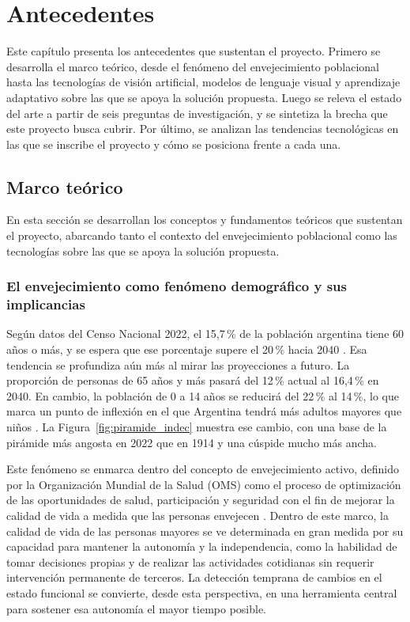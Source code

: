 \chapter{Antecedentes}\label{chapter02}

Este capítulo presenta los antecedentes que sustentan el proyecto.
Primero se desarrolla el marco teórico, desde el fenómeno del envejecimiento poblacional hasta las tecnologías de visión artificial, modelos de lenguaje visual y aprendizaje adaptativo sobre las que se apoya la solución propuesta.
Luego se releva el estado del arte a partir de seis preguntas de investigación, y se sintetiza la brecha que este proyecto busca cubrir.
Por último, se analizan las tendencias tecnológicas en las que se inscribe el proyecto y cómo se posiciona frente a cada una.

\section{Marco teórico}

En esta sección se desarrollan los conceptos y fundamentos teóricos que sustentan el proyecto, abarcando tanto el contexto del envejecimiento poblacional como las tecnologías sobre las que se apoya la solución propuesta.

\subsection{El envejecimiento como fenómeno demográfico y sus implicancias}

Según datos del Censo Nacional 2022, el 15,7\,\% de la población argentina tiene 60 años o más, y se espera que ese porcentaje supere el 20\,\% hacia 2040 \parencite{INDEC2024}.
Esa tendencia se profundiza aún más al mirar las proyecciones a futuro.
La proporción de personas de 65 años y más pasará del 12\,\% actual al 16,4\,\% en 2040.
En cambio, la población de 0 a 14 años se reducirá del 22\,\% al 14\,\%, lo que marca un punto de inflexión en el que Argentina tendrá más adultos mayores que niños \parencite{INDEC2024}.
La Figura~\ref{fig:piramide_indec} muestra ese cambio, con una base de la pirámide más angosta en 2022 que en 1914 y una cúspide mucho más ancha.

Este fenómeno se enmarca dentro del concepto de envejecimiento activo, definido por la Organización Mundial de la Salud (OMS) como el proceso de optimización de las oportunidades de salud, participación y seguridad con el fin de mejorar la calidad de vida a medida que las personas envejecen \parencite{OMS2002}.
Dentro de este marco, la calidad de vida de las personas mayores se ve determinada en gran medida por su capacidad para mantener la autonomía y la independencia, como la habilidad de tomar decisiones propias y de realizar las actividades cotidianas sin requerir intervención permanente de terceros.
La detección temprana de cambios en el estado funcional se convierte, desde esta perspectiva, en una herramienta central para sostener esa autonomía el mayor tiempo posible.

